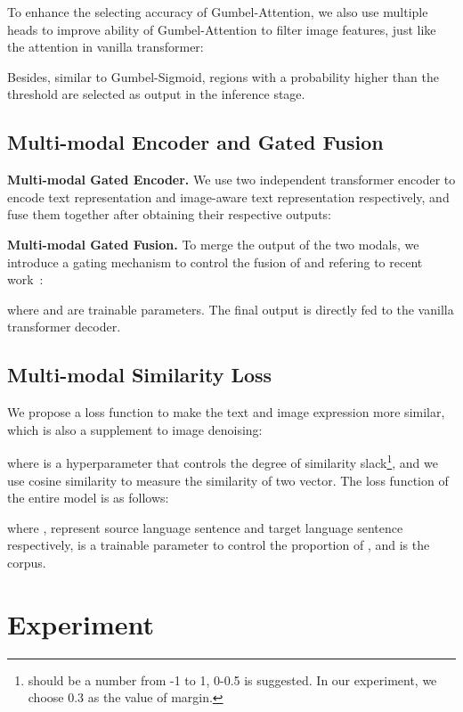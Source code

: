 \documentclass{article}
\begin{document}
To enhance the selecting accuracy of Gumbel-Attention, we also use multiple heads to improve ability of Gumbel-Attention to filter image features, just like the attention in vanilla transformer:



Besides, similar to Gumbel-Sigmoid, regions with a probability higher than the threshold are selected as output in the inference stage.





\subsection{Multi-modal Encoder and Gated Fusion}
\textbf{Multi-modal Gated Encoder.} We use two independent transformer encoder to encode text representation and image-aware text representation respectively, and fuse them together after obtaining their respective outputs:

\textbf{Multi-modal Gated Fusion.} To merge the output of the two modals, we introduce a gating mechanism to control the fusion of  and  refering to recent work~\cite{DBLP:conf/iclr/0001C0USLZ20}:


where  and  are trainable parameters. The final output  is directly fed to the vanilla transformer decoder.





\subsection{Multi-modal Similarity Loss}
We propose a loss function to make the text and image expression more similar, which is also a supplement to image denoising:

where  is a hyperparameter that controls the degree of similarity slack\footnote{ should be a number from -1 to 1, 0-0.5 is suggested. In our experiment, we choose 0.3 as the value of margin.}, and we use cosine similarity to measure the similarity of two vector. The loss function of the entire model is as follows:


where ,  represent source language sentence and target language sentence respectively,  is a trainable parameter to control the proportion of , and  is the corpus.





\section{Experiment}
\end{document}
